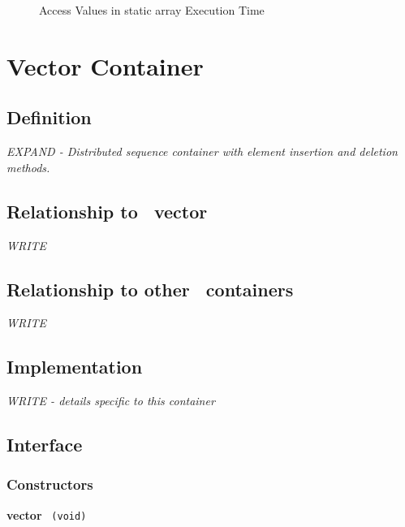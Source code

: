 \begin{figure}[p]
\caption{Access Values in static array Execution Time}
\label{fig:stary-cont-access-exper}
\end{figure}



\section{Vector Container} \label{sec-vec-cont}

\subsection{Definition}

\textit{EXPAND - Distributed sequence container with element insertion and deletion methods.}

\subsection{Relationship to \stl\ vector}

\textit{WRITE}

\subsection{Relationship to other \stapl\ containers}

\textit{WRITE}

\subsection{Implementation}

\textit{WRITE - details specific to this container}

\subsection{Interface} \label{sec-vec-cont-inter}

\subsubsection{Constructors}

\noindent
\textbf{vector}%
\texttt{%
(void)
}
 
